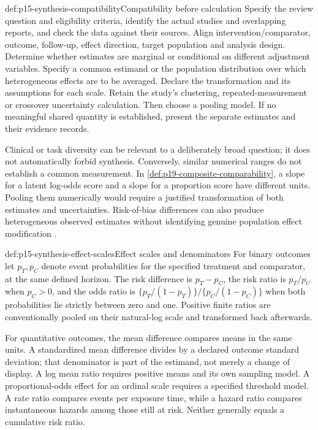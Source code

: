 \begin{hbmethod}{def:p15-synthesis-compatibility}{Compatibility before calculation}
Specify the review question and eligibility criteria, identify the actual
studies and overlapping reports, and check the data against their sources.
Align intervention/comparator, outcome, follow-up, effect direction, target
population and analysis design. Determine whether estimates are marginal or
conditional on different adjustment variables. Specify a common estimand or
the population distribution over which heterogeneous effects are to be averaged.
Declare the transformation and its assumptions for each scale. Retain the
study's clustering, repeated-measurement or crossover uncertainty calculation.
Then choose a pooling model. If no meaningful shared quantity is established,
present the separate estimates and their evidence records.
\end{hbmethod}

Clinical or task diversity can be relevant to a deliberately broad question;
it does not automatically forbid synthesis. Conversely, similar numerical
ranges do not establish a common measurement. In
\ref{def:p19-composite-comparability}, a slope for a latent log-odds score and
a slope for a proportion score have different units. Pooling them numerically
would require a justified transformation of both estimates and uncertainties.
Risk-of-bias differences can also produce heterogeneous observed estimates
without identifying genuine population effect modification
\cite[secs.~10.1, 10.10.1]{DeeksEtAl2024Cochrane10}.

\begin{hbdefinition}{def:p15-synthesis-effect-scales}{Effect scales and denominators}
For binary outcomes let \(p_T,p_C\) denote event probabilities for the
specified treatment and comparator, at the same defined horizon. The risk
difference is \(p_T-p_C\), the risk ratio is \(p_T/p_C\) when
\(p_C>0\), and the odds ratio is
\(\{p_T/(1-p_T)\}/\{p_C/(1-p_C)\}\) when both probabilities lie
strictly between zero and one. Positive finite ratios are conventionally pooled on their
natural-log scale and transformed back afterwards.

For quantitative outcomes, the mean difference compares means in the same
units. A standardized mean difference divides by a declared outcome standard
deviation; that denominator is part of the estimand, not merely a change of
display. A log mean ratio requires positive means and its own sampling model.
A proportional-odds effect for an ordinal scale requires a specified threshold
model. A rate ratio compares events per exposure time, while a hazard ratio
compares instantaneous hazards among those still at risk. Neither generally
equals a cumulative risk ratio.
\end{hbdefinition}

